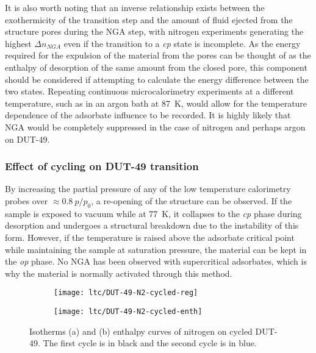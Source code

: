 It is also worth noting that an inverse relationship exists 
between the exothermicity of the transition step and the 
amount of fluid ejected from the structure pores during the NGA 
step, with nitrogen experiments generating the highest \(\Delta n_{NGA}\)
even if the transition to a \textit{cp} state is incomplete.
As the energy required for the expulsion of the material from the 
pores can be thought of as the enthalpy of desorption of the same amount
from the closed pore, this component should be considered if 
attempting to calculate the energy difference between the two states.
Repeating continuous microcalorimetry experiments at a different 
temperature, such as in an argon bath at \SI{87}{\kelvin}, would 
allow for the temperature dependence of the adsorbate influence 
to be recorded. It is highly likely that NGA would be completely 
suppressed in the case of nitrogen and perhaps argon on DUT-49.

\subsubsection{Effect of cycling on DUT-49 transition}

By increasing the partial pressure of any of the low temperature 
calorimetry probes over \(\approx 0.8~p/p_0\), a re-opening
of the structure can be observed. If the sample is exposed to 
vacuum while at \SI{77}{\kelvin}, it collapses to the \textit{cp}
phase during desorption and undergoes a structural breakdown 
due to the instability of this form. However, if the temperature 
is raised above the adsorbate critical point while maintaining the
sample at saturation pressure, the material can be kept in the 
\textit{op} phase. No NGA has been observed with supercritical 
adsorbates, which is why the material is normally activated through
this method. 

\begin{figure}[htb]
    \centering
    \begin{subfigure}[c]{0.5\linewidth}
        \texttt{[image: ltc/DUT-49-N2-cycled-reg]}%
        \caption{}\label{dut:fig:dut-49-cycle-reg}
    \end{subfigure}%
    \begin{subfigure}[h]{0.5\linewidth}
        \centering
        \texttt{[image: ltc/DUT-49-N2-cycled-enth]}%
        \caption{}\label{dut:fig:dut-49-cycle-enth}
    \end{subfigure}%
    \caption{Isotherms (a) and (b) enthalpy curves of nitrogen on
    cycled DUT-49. The first cycle is in black and the second 
    cycle is in blue.}%
    \label{dut:fig:dut-49-cycle}
\end{figure}

